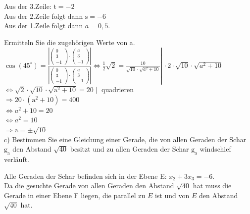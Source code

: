 \documentclass[10pt]{article}
\begin{document}
Aus der 3.Zeile: $\mathrm{t}=-2$\\
Aus der 2.Zeile folgt dann $\mathrm{s}=-6$\\
Aus der 1.Zeile folgt dann $a=0,5$.

Ermitteln Sie die zugehörigen Werte von a.\\
$\left.\cos \left(45^{\circ}\right)=\frac{\left|\left(\begin{array}{c}0 \\ 3 \\ -1\end{array}\right) \cdot\left(\begin{array}{c}a \\ 3 \\ -1\end{array}\right)\right|}{\left|\left(\begin{array}{c}0 \\ 3 \\ -1\end{array}\right) \cdot\left(\begin{array}{c}a \\ 3 \\ -1\end{array}\right)\right|} \Leftrightarrow \frac{1}{2} \sqrt{2}=\frac{10}{\sqrt{10} \cdot \sqrt{a^{2}+10}} \right\rvert\, \cdot 2 \cdot \sqrt{10} \cdot \sqrt{a^{2}+10}$\\
$\Leftrightarrow \sqrt{2} \cdot \sqrt{10} \cdot \sqrt{\mathrm{a}^{2}+10}=20 \mid$ quadrieren\\
$\Rightarrow 20 \cdot\left(\mathrm{a}^{2}+10\right)=400$\\
$\Leftrightarrow a^{2}+10=20$\\
$\Leftrightarrow a^{2}=10$\\
$\Rightarrow \mathrm{a}= \pm \sqrt{10}$\\
c) Bestimmen Sie eine Gleichung einer Gerade, die von allen Geraden der Schar $\mathrm{g}_{\mathrm{a}}$ den Abstand $\sqrt{40}$ besitzt und zu allen Geraden der Schar $\mathrm{g}_{\mathrm{a}}$ windschief verläuft.

Alle Geraden der Schar befinden sich in der Ebene E: $x_{2}+3 x_{3}=-6$.\\
Da die gesuchte Gerade von allen Geraden den Abstand $\sqrt{40}$ hat muss die Gerade in einer Ebene F liegen, die parallel zu $E$ ist und von $E$ den Abstand $\sqrt{40}$ hat.
\end{document}
